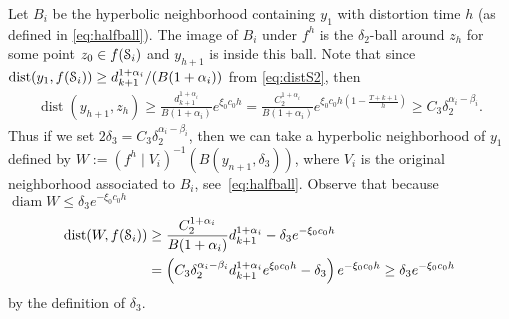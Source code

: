 \documentclass[reqno,12pt,a4paper]{amsart}
\theoremstyle{plain}
\theoremstyle{definition}
\begin{document}
  Let $B_i$ be the hyperbolic neighborhood containing $y_1$
  with distortion time $h$ (as defined in
  \eqref{eq:halfball}).  The image of $B_i$ under $f^h$ is
  the $\delta_2$-ball around $z_h$ for some point $z_0\in
  f({\EuScript{S}}_i)$ and $y_{h+1}$ is inside this ball. Note that since
  ${\operatorname{dist}}(y_1,f({\EuScript{S}}_i))\ge
  d_{k+1}^{1+\alpha_i}/(B(1+\alpha_i))$
  from \eqref{eq:distS2}, then
  \begin{align}\label{eq:distB}
    {\operatorname{dist}}(y_{h+1},z_h)\ge
    \frac{d_{k+1}^{1+\alpha_i}}{B(1+\alpha_i)}
    e^{\xi_0 c_0 h}
    =
    \frac{C_2^{1+\alpha_i}}
    {B(1+\alpha_i)}e^{\xi_0 c_0 h
      (1- \frac{T+k+1}{h})}
    \ge  C_3 \delta_2^{\alpha_i-\beta_i}.
  \end{align}
  Thus if we set $2\delta_3=C_3
  \delta_2^{\alpha_i-\beta_i}$, then we can take a
  hyperbolic neighborhood of $y_1$ defined by $W:=(f^h\mid
  V_i)^{-1}(B(y_{n+1},\delta_3))$, where $V_i$ is the
  original neighborhood associated to $B_i$,
  see~\eqref{eq:halfball}. Observe that because ${\operatorname{diam}} W\le
  \delta_3 e^{-\xi_0 c_0 h}$
  \begin{align*}
    {\operatorname{dist}}(W,f({\EuScript{S}}_i))
    &\ge
    \frac{C_2^{1+\alpha_i}}{B(1+\alpha_i)}
    d_{k+1}^{1+\alpha_i}
    - \delta_3 e^{-\xi_0 c_0 h}
    \\
    &=
    \left(C_3\delta_2^{\alpha_i-\beta_i}d_{k+1}^{1+\alpha_i}
      e^{\xi_0 c_0 h} -\delta_3 \right)e^{-\xi_0 c_0 h}
    \ge
    \delta_3 e^{-\xi_0 c_0 h}
  \end{align*}
  by the definition of $\delta_3$.
\end{document}
